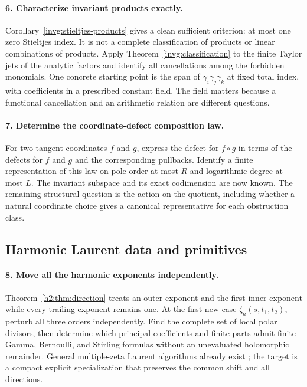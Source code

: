 \documentclass[11pt,a4paper]{article}
\theoremstyle{definition}
\theoremstyle{remark}
\numberwithin{equation}{section}
\begin{document}
\paragraph{6. Characterize invariant products exactly.}
Corollary~\ref{invg:stieltjes-products} gives a clean sufficient
criterion: at most one zero Stieltjes index. It is not a complete
classification of products or linear combinations of products.
Apply Theorem~\ref{invg:classification} to the finite Taylor jets of
the analytic factors and identify all cancellations among the
forbidden monomials. One concrete starting point is the span of
$\gamma_i\gamma_j\gamma_k$ at fixed total index, with coefficients
in a prescribed constant field. The field matters because a
functional cancellation and an arithmetic relation are different
questions.

\paragraph{7. Determine the coordinate-defect composition law.}
For two tangent coordinates $f$ and $g$, express the defect for
$f\circ g$ in terms of the defects for $f$ and $g$ and the
corresponding pullbacks. Identify a finite representation of this
law on pole order at most $R$ and logarithmic degree at most $L$.
The invariant subspace and its exact codimension are now known.
The remaining structural question is the action on the quotient,
including whether a natural coordinate choice gives a canonical
representative for each obstruction class.

\subsection{Harmonic Laurent data and primitives}

\paragraph{8. Move all the harmonic exponents independently.}
Theorem~\ref{h2:thm:direction} treats an outer exponent and the first
inner exponent while every trailing exponent remains one.
At the first new case
$\zeta_a(s,t_1,t_2)$, perturb all three orders independently.
Find the complete set of local polar divisors, then determine which
principal coefficients and finite parts admit finite Gamma,
Bernoulli, and Stirling formulas without an unevaluated
holomorphic remainder. General multiple-zeta Laurent algorithms
already exist \cite{h2:MOW}; the target is a compact explicit
specialization that preserves the common shift and all directions.
\end{document}
